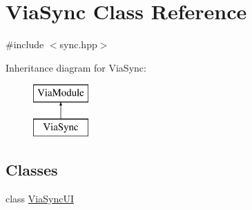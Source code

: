 \hypertarget{class_via_sync}{}\section{Via\+Sync Class Reference}
\label{class_via_sync}


{\ttfamily \#include $<$sync.\+hpp$>$}

Inheritance diagram for Via\+Sync\+:\begin{figure}[H]
\begin{center}
\leavevmode
\includegraphics[height=2.000000cm]{class_via_sync}
\end{center}
\end{figure}
\subsection*{Classes}
\begin{DoxyCompactItemize}
\item 
class \mbox{\hyperlink{class_via_sync_1_1_via_sync_u_i}{Via\+Sync\+UI}}
\end{DoxyCompactItemize}
